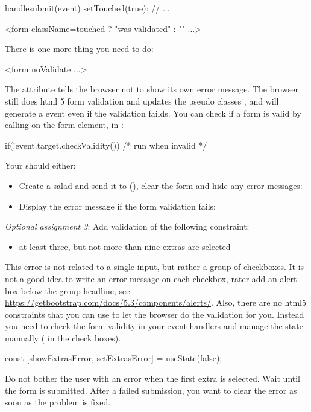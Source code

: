 \documentclass[fleqn, article, a4paper]{memoir}
\begin{document}
\begin{Assignments}
\begin{Code}
handlesubmit(event) {
  setTouched(true);
  // ...
}

<form className={touched ? "was-validated" : ""} ...>
\end{Code}
There is one more thing you need to do:
\begin{Code}
<form noValidate ...>
\end{Code}
The attribute  tells the browser not to show its own error message. The browser still does html 5 form validation and updates the pseudo classes ,  and will generate a  event even if the validation failds. You can check if a form is valid by calling  on the form element, in :
\begin{Code}
if(!event.target.checkValidity()){ /* run when invalid */ }
\end{Code}

\noindent Your  should either:
\begin{itemize}
  \item Create a salad and send it to  (), clear the form and hide any error messages: 
  \item Display the error message if the form validation fails: 
\end{itemize}

\item \emph{Optional assignment 3}: Add validation of the following constraint:
\begin{itemize}
  \item at least three, but not more than nine extras are selected
\end{itemize}
This error is not related to a single input, but rather a group of checkboxes. It is not a good idea to write an error message on each checkbox, rater add an alert box below the group headline, see \url{https://getbootstrap.com/docs/5.3/components/alerts/}. Also, there are no html5 constraints that you can use to let the browser do the validation for you. Instead you need to check the form validity in your event handlers and manage the state manually ( in the check boxes).
\begin{Code}
const [showExtrasError, setExtrasError] = useState(false);
\end{Code}
Do not bother the user with an error when the first extra is selected. Wait until the form is submitted. After a failed submission, you want to clear the error as soon as the problem is fixed.


\end{Assignments}
\end{document}
